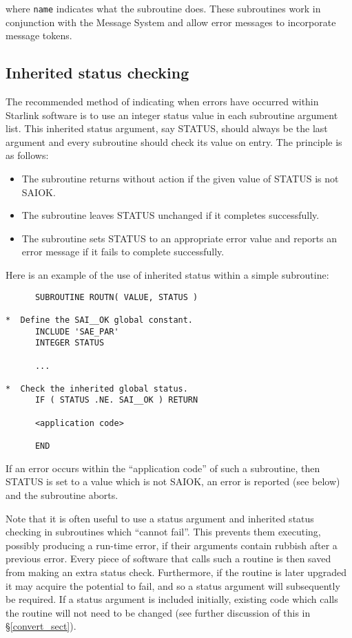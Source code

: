 \documentclass[twoside,11pt]{article}
\newcommand{\htmlref}[2]{#1}
\newcommand{\latex}[1]{#1}
\newcommand{\xlabel}[1]{}
\renewcommand{\_}{\texttt{\symbol{95}}}
\begin{document}
where \texttt{name} indicates what the subroutine does.
These subroutines work in conjunction with the Message System and allow error
messages to incorporate message tokens. 


\subsection{\xlabel{inherited_status_checking}Inherited status checking
\label{inherited_status} \xlabel{inherited_status}} 
The recommended method of indicating when errors have occurred within
Starlink software is to use an integer status value in each subroutine
argument list. 
This inherited status argument, say STATUS, should always be the last
argument and every subroutine should check its value on entry. 
The principle is as follows:

\begin {itemize}
\item The subroutine returns without action if the given value of STATUS is 
not SAI\_\_OK. 

\item The subroutine leaves STATUS unchanged if it completes successfully.

\item The subroutine sets STATUS to an appropriate error value and reports an
error message if it fails to complete successfully. 
\end {itemize}

Here is an example of the use of inherited status within a simple subroutine:

\begin {small}
\begin{verbatim}
      SUBROUTINE ROUTN( VALUE, STATUS )
      
*  Define the SAI__OK global constant.
      INCLUDE 'SAE_PAR'
      INTEGER STATUS

      ...

*  Check the inherited global status.
      IF ( STATUS .NE. SAI__OK ) RETURN

      <application code>

      END
\end{verbatim}
\end {small}

If an error occurs within the ``application code'' of such a subroutine, then
STATUS is set to a value which is not SAI\_\_OK, an error is reported (see
below) and the subroutine aborts. 

Note that it is often useful to use a status argument and inherited status
checking in subroutines which ``cannot fail''. 
This prevents them executing, possibly producing a run-time error, if
their arguments contain rubbish after a previous error.
Every piece of software that calls such a routine is then saved from making
an extra status check. 
Furthermore, if the routine is later upgraded it may acquire the potential
to fail, and so a status argument will subsequently be required.
If a status argument is included initially, existing code which calls 
the routine will not need to be changed (see 
\htmlref{further discussion}{convert_sect}
of this\latex{ in \S\ref{convert_sect}}).
\end{document}
